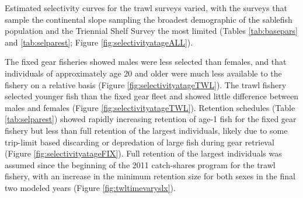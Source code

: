 \documentclass[11pt,
  english,
  a4paper,
]{article}
\begin{document}
\leavevmode\tagmcend\tagstructend\par

Estimated selectivity curves for the trawl surveys varied, with the surveys that sample the continental slope sampling the broadest demographic of the sablefish population and the Triennial Shelf Survey the most limited (Tables \ref{tab:basepars} and \ref{tab:selparest}; Figure \ref{fig:selectivityatageALL}).

The fixed gear fisheries showed males were less selected than females, and that individuals of approximately age 20 and older were much less available to the fishery on a relative basis (Figure \ref{fig:selectivityatageTWL}). The trawl fishery selected younger fish than the fixed gear fleet and showed little difference between males and females (Figure \ref{fig:selectivityatageTWL}). Retention schedules (Table \ref{tab:selparest}) showed rapidly increasing retention of age-1 fish for the fixed gear fishery but less than full retention of the largest individuals, likely due to some trip-limit based discarding or depredation of large fish during gear retrieval (Figure \ref{fig:selectivityatageFIX}). Full retention of the largest individuals was assumed since the beginning of the 2011 catch-shares program for the trawl fishery, with an increase in the minimum retention size for both sexes in the final two modeled years (Figure \ref{fig:twltimevaryslx}).

\leavevmode\tagmcend\tagstructend\par

\end{document}
